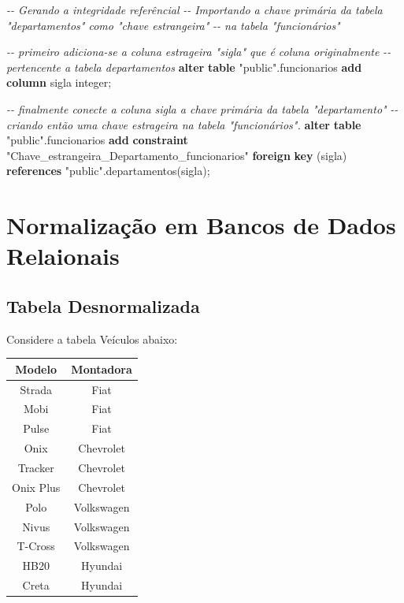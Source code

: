 \documentclass[
]{book}
\newenvironment{Shaded}{\begin{snugshade}}{\end{snugshade}}
\newcommand{\CommentTok}[1]{\textcolor[rgb]{0.56,0.35,0.01}{\textit{#1}}}
\newcommand{\DataTypeTok}[1]{\textcolor[rgb]{0.13,0.29,0.53}{#1}}
\newcommand{\KeywordTok}[1]{\textcolor[rgb]{0.13,0.29,0.53}{\textbf{#1}}}
\newcommand{\NormalTok}[1]{#1}
\newcommand{\OtherTok}[1]{\textcolor[rgb]{0.56,0.35,0.01}{#1}}
\begin{document}
\begin{Shaded}
\begin{Highlighting}[]
\CommentTok{{-}{-} Gerando a integridade referêncial }
\CommentTok{{-}{-} Importando a chave primária da tabela "departamentos" como "chave estrangeira"}
\CommentTok{{-}{-} na tabela "funcionários"}

\CommentTok{{-}{-} primeiro adiciona{-}se a coluna estrageira "sigla" que é coluna originalmente }
\CommentTok{{-}{-} pertencente a tabela departamentos}
\KeywordTok{alter} \KeywordTok{table} \OtherTok{"public"}\NormalTok{.funcionarios }\KeywordTok{add} \KeywordTok{column}\NormalTok{ sigla }\DataTypeTok{integer}\NormalTok{;}

\CommentTok{{-}{-} finalmente conecte a coluna sigla a chave primária da tabela "departamento"}
\CommentTok{{-}{-} criando então uma chave estrageira na tabela "funcionários".}
\KeywordTok{alter} \KeywordTok{table} \OtherTok{"public"}\NormalTok{.funcionarios }\KeywordTok{add} \KeywordTok{constraint} \OtherTok{"Chave\_estrangeira\_Departamento\_funcionarios"} \KeywordTok{foreign} \KeywordTok{key}\NormalTok{ (sigla) }\KeywordTok{references} \OtherTok{"public"}\NormalTok{.departamentos(sigla);}
\end{Highlighting}
\end{Shaded}

\section{Normalização em Bancos de Dados Relaionais}\label{normalizauxe7uxe3o-em-bancos-de-dados-relaionais}

\subsection{Tabela Desnormalizada}\label{tabela-desnormalizada}

Considere a tabela Veículos abaixo:

\begin{longtable}[]{@{}cc@{}}
\toprule\noalign{}
Modelo & Montadora \\
\midrule\noalign{}
\endhead
\bottomrule\noalign{}
\endlastfoot
Strada & Fiat \\
Mobi & Fiat \\
Pulse & Fiat \\
Onix & Chevrolet \\
Tracker & Chevrolet \\
Onix Plus & Chevrolet \\
Polo & Volkswagen \\
Nivus & Volkswagen \\
T-Cross & Volkswagen \\
HB20 & Hyundai \\
Creta & Hyundai \\
\end{longtable}
\end{document}
